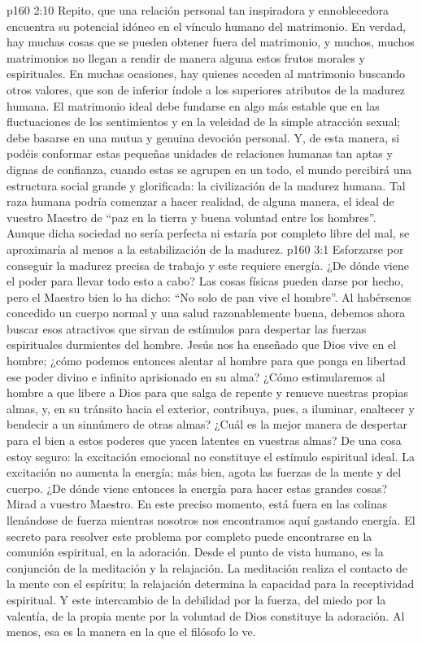 \vs p160 2:10 \pc Repito, que una relación personal tan inspiradora y ennoblecedora encuentra su potencial idóneo en el vínculo humano del matrimonio. En verdad, hay muchas cosas que se pueden obtener fuera del matrimonio, y muchos, muchos matrimonios no llegan a rendir de manera alguna estos frutos morales y espirituales. En muchas ocasiones, hay quienes acceden al matrimonio buscando otros valores, que son de inferior índole a los superiores atributos de la madurez humana. El matrimonio ideal debe fundarse en algo más estable que en las fluctuaciones de los sentimientos y en la veleidad de la simple atracción sexual; debe basarse en una mutua y genuina devoción personal. Y, de esta manera, si podéis conformar estas pequeñas unidades de relaciones humanas tan aptas y dignas de confianza, cuando estas se agrupen en un todo, el mundo percibirá una estructura social grande y glorificada: la civilización de la madurez humana. Tal raza humana podría comenzar a hacer realidad, de alguna manera, el ideal de vuestro Maestro de “paz en la tierra y buena voluntad entre los hombres”. Aunque dicha sociedad no sería perfecta ni estaría por completo libre del mal, se aproximaría al menos a la estabilización de la madurez.
\vs p160 3:1 Esforzarse por conseguir la madurez precisa de trabajo y este requiere energía. ¿De dónde viene el poder para llevar todo esto a cabo? Las cosas físicas pueden darse por hecho, pero el Maestro bien lo ha dicho: “No solo de pan vive el hombre”. Al habérsenos concedido un cuerpo normal y una salud razonablemente buena, debemos ahora buscar esos atractivos que sirvan de estímulos para despertar las fuerzas espirituales durmientes del hombre. Jesús nos ha enseñado que Dios vive en el hombre; ¿cómo podemos entonces alentar al hombre para que ponga en libertad ese poder divino e infinito aprisionado en su alma? ¿Cómo estimularemos al hombre a que libere a Dios para que salga de repente y renueve nuestras propias almas, y, en su tránsito hacia el exterior, contribuya, pues, a iluminar, enaltecer y bendecir a un sinnúmero de otras almas? ¿Cuál es la mejor manera de despertar para el bien a estos poderes que yacen latentes en vuestras almas? De una cosa estoy seguro: la excitación emocional no constituye el estímulo espiritual ideal. La excitación no aumenta la energía; más bien, agota las fuerzas de la mente y del cuerpo. ¿De dónde viene entonces la energía para hacer estas grandes cosas? Mirad a vuestro Maestro. En este preciso momento, está fuera en las colinas llenándose de fuerza mientras nosotros nos encontramos aquí gastando energía. El secreto para resolver este problema por completo puede encontrarse en la comunión espiritual, en la adoración. Desde el punto de vista humano, es la conjunción de la meditación y la relajación. La meditación realiza el contacto de la mente con el espíritu; la relajación determina la capacidad para la receptividad espiritual. Y este intercambio de la debilidad por la fuerza, del miedo por la valentía, de la propia mente por la voluntad de Dios constituye la adoración. Al menos, esa es la manera en la que el filósofo lo ve.

